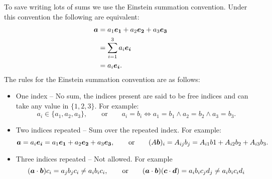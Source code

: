 To save writing lots of sums we use the Einstein summation convention.
Under this convention the following are equivalent:
\begin{align*}
    \bm{a} &= a_1\bm{e_{1}} + a_2\bm{e_{2}} + a_3\bm{e_{3}}\\
    &= \sum_{i=1}^{3} a_i\bm{e_{i}}\\
    &= a_i\bm{e_{i}}.
\end{align*}
The rules for the Einstein summation convention are as follows:
\begin{itemize}
    \item One index -- No sum, the indices present are said to be free indices and can take any value in \(\{1, 2, 3\}\).
    For example:
    \[a_i \in \{a_1, a_2, a_3\}, \qquad\text{or}\qquad a_i = b_i \iff a_1 = b_1 \wedge a_2 = b_2 \wedge a_3 = b_3.\]
    \item Two indices repeated -- Sum over the repeated index.
    For example:
    \[\bm{a} = a_i\bm{e_{i}} = a_1\bm{e_{1}} + a_2\bm{e_{2}} + a_3\bm{e_{3}}, \qquad\text{or}\qquad (A\bm{b})_i = A_{ij}b_j = A_{i1}b1 + A_{i2}b_2 + A_{i3}b_3.\]
    \item Three indices repeated -- Not allowed.
    For example
    \[(\bm{a}\cdot\bm{b})c_i = a_jb_jc_i \ne a_ib_ic_i, \qquad\text{or}\qquad (\bm{a}\cdot\bm{b})(\bm{c}\cdot\bm{d}) = a_ib_ic_jd_j \ne a_ib_ic_id_i\]
\end{itemize}

